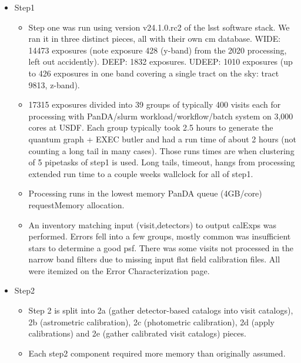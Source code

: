 \begin{itemize}

\item Step1
\begin{itemize}

  \item
Step one was run using version v24.1.0.rc2 of the lsst software stack. We ran it in three distinct pieces, all with their own cm database.  WIDE: 14473 exposures (note exposure 428 (y-band) from the 2020 processing, left out accidently). DEEP: 1832 exposures. UDEEP: 1010 exposures (up to 426  exposures in one band covering a single tract on the sky: tract 9813, z-band).  

  \item
17315 exposures divided into 39 groups of typically 400 visits each for processing with PanDA/slurm workload/workflow/batch system on 3,000 cores at USDF.  Each group typically took 2.5 hours to generate the quantum graph + EXEC butler and had a run time of about 2 hours (not counting a long tail in many cases). Those
runs times are  when clustering of 5 pipetasks of step1 is used. Long tails, timeout, hangs from processing extended run time to a couple weeks wallclock for all of step1.

\item
Processing runs in the lowest memory PanDA queue (4GB/core) requestMemory allocation.

\item An inventory matching input (visit,detectors) to output calExps was performed.  Errors fell into a few groups, mostly common was insufficient stars
to determine a good psf.  There was some visits not processed 
in the narrow band filters due to missing input flat field
calibration files.  All were itemized on the Error Characterization page.

\end{itemize} %

\item Step2
\begin{itemize}

 \item
	 Step 2 is split into 2a (gather detector-based catalogs into
		visit catalogs), 2b (astrometric calibration), 2c (photometric
		calibration), 2d (apply calibrations) and 2e (gather
		calibrated visit catalogs) pieces.

\item 
	Each step2 component required more memory than originally
	assumed.  
		

\end{itemize}
\end{itemize}
